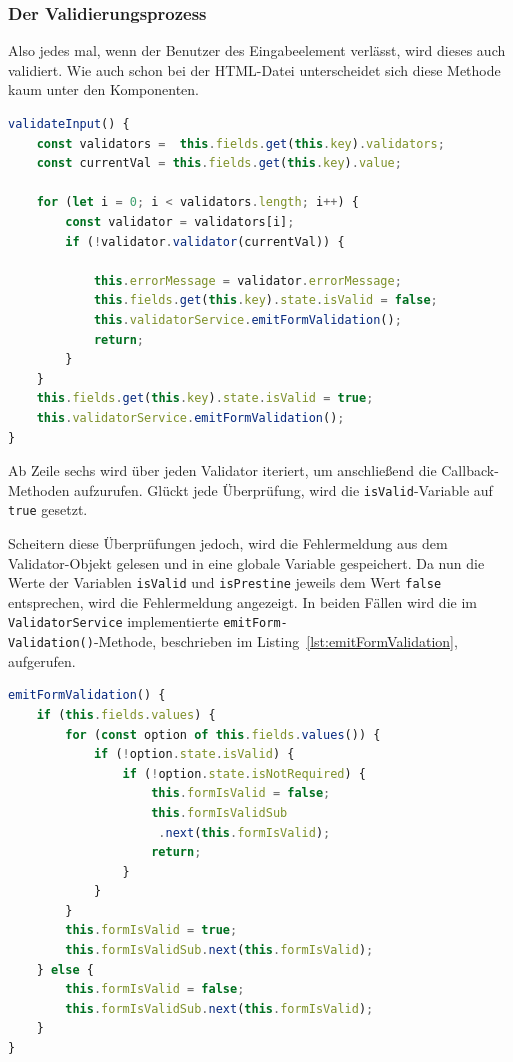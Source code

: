 \subsubsection{Der Validierungsprozess}

Also jedes mal, wenn der Benutzer des Eingabeelement verlässt, wird dieses auch validiert. Wie auch schon bei der HTML-Datei unterscheidet sich diese Methode kaum unter den Komponenten.

\begin{lstlisting}[caption={Die Validierung innerhalb Komponenten}, language=JavaScript,label={lst:validateInput}]
validateInput() {
	const validators =  this.fields.get(this.key).validators;
	const currentVal = this.fields.get(this.key).value;
	
	for (let i = 0; i < validators.length; i++) {
		const validator = validators[i];
		if (!validator.validator(currentVal)) {
			
			this.errorMessage = validator.errorMessage;
			this.fields.get(this.key).state.isValid = false;
			this.validatorService.emitFormValidation();
			return;
		}
	}
	this.fields.get(this.key).state.isValid = true;
	this.validatorService.emitFormValidation();
}
\end{lstlisting}

Ab Zeile sechs wird über jeden Validator iteriert, um anschließend die Callback-Methoden aufzurufen. Glückt jede Überprüfung, wird die \texttt{isValid}-Variable auf \texttt{true} gesetzt. 

Scheitern diese Überprüfungen jedoch, wird die Fehlermeldung aus dem Validator-Objekt gelesen und in eine globale Variable gespeichert. Da nun die Werte der Variablen \texttt{isValid} und \texttt{isPrestine} jeweils dem Wert \texttt{false} entsprechen, wird die Fehlermeldung angezeigt. In beiden Fällen wird die im \texttt{ValidatorService} implementierte \texttt{emitForm-\\Validation()}-Methode, beschrieben im Listing~\ref{lst:emitFormValidation}, aufgerufen.

\begin{lstlisting}[caption={Die Validierung aller Komponenten im \texttt{ValidatorService}}, language=JavaScript,label={lst:emitFormValidation}]
emitFormValidation() {
	if (this.fields.values) {
		for (const option of this.fields.values()) {
			if (!option.state.isValid) {
				if (!option.state.isNotRequired) {
					this.formIsValid = false;
					this.formIsValidSub
					 .next(this.formIsValid);
					return;
				}
			}
		}
		this.formIsValid = true;
		this.formIsValidSub.next(this.formIsValid);
	} else {
		this.formIsValid = false;
		this.formIsValidSub.next(this.formIsValid);
	}
}
\end{lstlisting}

